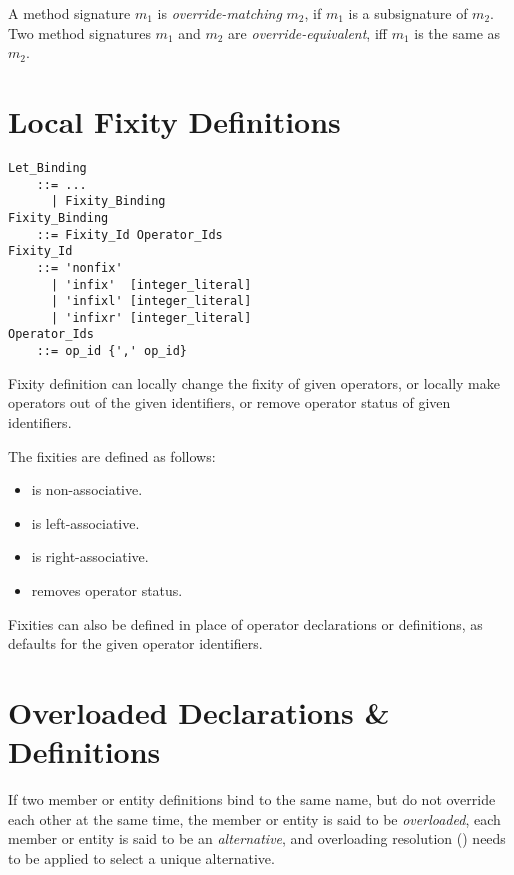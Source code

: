 A method signature $m_1$ is {\em override-matching} $m_2$, if $m_1$ is a subsignature of $m_2$. Two method signatures $m_1$ and $m_2$ are {\em override-equivalent}, iff $m_1$ is the same as $m_2$. 






\section{Local Fixity Definitions}
\label{sec:fixity-defs}

\grammar\begin{lstlisting}
Let_Binding 
    ::= ...
      | Fixity_Binding
Fixity_Binding
    ::= Fixity_Id Operator_Ids
Fixity_Id
    ::= 'nonfix'
      | 'infix'  [integer_literal]
      | 'infixl' [integer_literal]
      | 'infixr' [integer_literal]
Operator_Ids
    ::= op_id {',' op_id}
\end{lstlisting}

Fixity definition can locally change the fixity of given operators, or locally make operators out of the given identifiers, or remove operator status of given identifiers. 

The fixities are defined as follows:
\begin{itemize}
  \item {} is non-associative. 
  \item {} is left-associative. 
  \item {} is right-associative. 
  \item {} removes operator status. 
\end{itemize}

Fixities can also be defined in place of operator declarations or definitions, as defaults for the given operator identifiers. 




\section{Overloaded Declarations \& Definitions}
\label{sec:overloaded-definitions}

If two member or entity definitions bind to the same name, but do not override each other at the same time, the member or entity is said to be {\em overloaded}, each member or entity is said to be an {\em alternative}, and overloading resolution () needs to be applied to select a unique alternative. 

